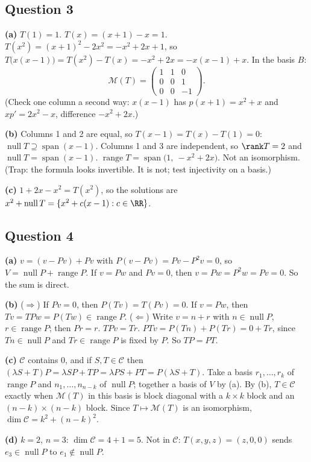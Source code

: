\documentclass[11pt]{scrartcl}
\DeclareMathOperator{\nul}{null}
\DeclareMathOperator{\range}{range}
\DeclareMathOperator{\spn}{span}
\newcommand{\MM}{\mathcal M}
\begin{document}
\subsection*{Question 3}
\textbf{(a)} $T(1)=1$. $T(x)=(x+1)-x=1$. $T(x^2)=(x+1)^2-2x^2=-x^2+2x+1$, so $T\big(x(x-1)\big)=T(x^2)-T(x)=-x^2+2x=-x(x-1)+x$. In the basis $B$:
\[ \MM(T)=\begin{pmatrix}1&1&0\\0&0&1\\0&0&-1\end{pmatrix}. \]
(Check one column a second way: $x(x-1)$ has $p(x+1)=x^2+x$ and $xp'=2x^2-x$, difference $-x^2+2x$.)

\textbf{(b)} Columns 1 and 2 are equal, so $T(x-1)=T(x)-T(1)=0$: $\nul T\supseteq\spn(x-1)$. Columns 1 and 3 are independent, so $\rank T=2$ and $\nul T=\spn(x-1)$. $\range T=\spn\big(1,\ -x^2+2x\big)$. Not an isomorphism.
(Trap: the formula looks invertible. It is not; test injectivity on a basis.)

\textbf{(c)} $1+2x-x^2=T(x^2)$, so the solutions are $x^2+\nul T=\{x^2+c(x-1):c\in\RR\}$.

\subsection*{Question 4}
\textbf{(a)} $v=(v-Pv)+Pv$ with $P(v-Pv)=Pv-P^2v=0$, so $V=\nul P+\range P$. If $v=Pw$ and $Pv=0$, then $v=Pw=P^2w=Pv=0$. So the sum is direct.

\textbf{(b)} ($\Rightarrow$) If $Pv=0$, then $P(Tv)=T(Pv)=0$. If $v=Pw$, then $Tv=TPw=P(Tw)\in\range P$.
($\Leftarrow$) Write $v=n+r$ with $n\in\nul P$, $r\in\range P$; then $Pr=r$. $TPv=Tr$. $PTv=P(Tn)+P(Tr)=0+Tr$, since $Tn\in\nul P$ and $Tr\in\range P$ is fixed by $P$. So $TP=PT$.

\textbf{(c)} $\mathcal C$ contains $0$, and if $S,T\in\mathcal C$ then $(\lambda S+T)P=\lambda SP+TP=\lambda PS+PT=P(\lambda S+T)$.
Take a basis $r_1,\dots,r_k$ of $\range P$ and $n_1,\dots,n_{n-k}$ of $\nul P$; together a basis of $V$ by (a). By (b), $T\in\mathcal C$ exactly when $\MM(T)$ in this basis is block diagonal with a $k\times k$ block and an $(n-k)\times(n-k)$ block. Since $T\mapsto\MM(T)$ is an isomorphism, $\dim\mathcal C=k^2+(n-k)^2$.

\textbf{(d)} $k=2$, $n=3$: $\dim\mathcal C=4+1=5$. Not in $\mathcal C$: $T(x,y,z)=(z,0,0)$ sends $e_3\in\nul P$ to $e_1\notin\nul P$.
\end{document}

